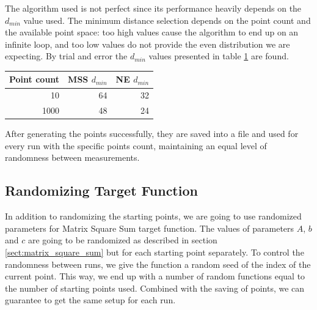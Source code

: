 \documentclass[a4paper,english,titlepage,12pt]{article}
\begin{document}
The algorithm used is not perfect since its performance heavily depends on the $d_{min}$ value used. The minimum distance selection depends on the point count and the available point space: too high values cause the algorithm to end up on an infinite loop, and too low values do not provide the even distribution we are expecting. By trial and error the $d_{min}$ values presented in table \ref{tab:dmin_values} are found.

\begin{table}[H]
\centering
{}
\label{tab:dmin_values}
\begin{tabular}{|r|r|r|}
\hline
\rowcolor[HTML]{C0C0C0} 
Point count                       & MSS $d_{min}$ & NE $d_{min}$ \\ \hline
\cellcolor[HTML]{EFEFEF}10   & 64           & 32          \\ \hline
\cellcolor[HTML]{EFEFEF}1000 & 48           & 24          \\ \hline
\end{tabular}
\end{table}

After generating the points successfully, they are saved into a file and used for every run with the specific points count, maintaining an equal level of randomness between measurements.

\subsection{Randomizing Target Function}

In addition to randomizing the starting points, we are going to use randomized parameters for Matrix Square Sum target function. The values of parameters $A$, $b$ and $c$ are going to be randomized as described in section \ref{sect:matrix_square_sum} but for each starting point separately. To control the randomness between runs, we give the function a random seed of the index of the current point. This way, we end up with a number of random functions equal to the number of starting points used. Combined with the saving of points, we can guarantee to get the same setup for each run.


\end{document}
